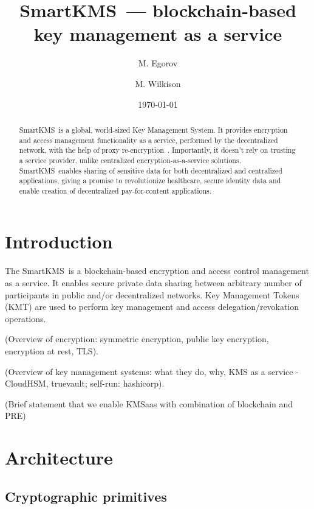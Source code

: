 \documentclass[notitlepage,longbibliography]{revtex4-1}
\newcommand{\kms}{SmartKMS}
\begin{document}
\title{\kms~--- blockchain-based key management as a service}

\author{M. Egorov}
\author{M. Wilkison}


\begin{abstract}
    \kms~is a global, world-sized Key Management System.
    It provides encryption and access management functionality as a service, performed by the decentralized network,
    with the help of proxy re-encryption~\cite{wiki:pre}.
    Importantly, it doesn't rely on trusting a service provider, unlike centralized encryption-as-a-service solutions.
    \kms~enables sharing of sensitive data for both decentralized and centralized applications,
    giving a promise to revolutionize healthcare, secure identity data and enable creation of decentralized pay-for-content applications.
\end{abstract}

\date{\today}
\maketitle

\section{Introduction}

The \kms~is a blockchain-based encryption and access control management as a service.
It enables secure private data sharing between arbitrary number of participants in public and/or decentralized networks.
Key Management Tokens (KMT) are used to perform key management and access delegation/revokation operations.

(Overview of encryption: symmetric encryption, public key encryption, encryption at rest, TLS).

(Overview of key management systems: what they do, why, KMS as a service - CloudHSM, truevault; self-run: hashicorp).

(Brief statement that we enable KMSaas with combination of blockchain and PRE)

\section{Architecture}

\subsection{Cryptographic primitives}
\end{document}
